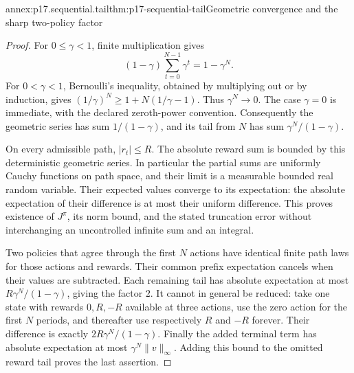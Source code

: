 \begin{annexitem}{annex:p17.sequential.tail}{thm:p17-sequential-tail}{Geometric convergence and the sharp two-policy factor}
\begin{proof}
For \(0\leq\gamma<1\), finite multiplication gives
\[
              (1-\gamma)\sum_{t=0}^{N-1}\gamma^t
                           =1-\gamma^N.
\]
For \(0<\gamma<1\), Bernoulli's inequality, obtained
by multiplying out or by induction, gives
\((1/\gamma)^N\geq1+N(1/\gamma-1)\).
Thus \(\gamma^N\to0\). The case \(\gamma=0\)
is immediate, with the declared zeroth-power convention.
Consequently the geometric series has sum
\(1/(1-\gamma)\), and its tail from \(N\)
has sum \(\gamma^N/(1-\gamma)\).

On every admissible path, \(|r_t|\leq R\).
The absolute reward sum is bounded by this deterministic
geometric series. In particular the partial sums are
uniformly Cauchy functions on path space, and their
limit is a measurable bounded real random variable.
Their expected values converge to its expectation:
the absolute expectation of their difference is at
most their uniform difference.
This proves existence of \(J^\pi\), its norm bound,
and the stated truncation error without interchanging
an uncontrolled infinite sum and an integral.

Two policies that agree through the first \(N\)
actions have identical finite path laws for those
actions and rewards. Their common prefix expectation
cancels when their values are subtracted. Each remaining
tail has absolute expectation at most
\(R\gamma^N/(1-\gamma)\), giving the factor \(2\).
It cannot in general be reduced: take one state
with rewards \(0,R,-R\) available at three actions,
use the zero action for the first \(N\) periods,
and thereafter use respectively \(R\) and \(-R\)
forever. Their difference is exactly
\(2R\gamma^N/(1-\gamma)\).
Finally the added terminal term has absolute expectation
at most \(\gamma^N\|v\|_\infty\).
Adding this bound to the omitted reward tail proves
the last assertion.
\end{proof}
\end{annexitem}

